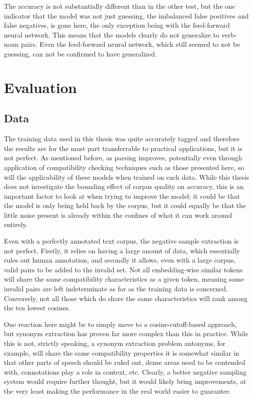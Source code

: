 \documentclass[a4paper, 12pt]{article}
\begin{document}
The accuracy is not substantially different than in the other test, but the one indicator that the model was not just guessing, the imbalanced false positives and false negatives, is gone here, the only exception being with the feed-forward neural network. This means that the models clearly do not generalize to verb-noun pairs. Even the feed-forward neural network, which still seemed to not be guessing, can not be confirmed to have generalized.


\section{Evaluation}

\subsection{Data}
The training data used in this thesis was quite accurately tagged and therefore the results are for the most part transferrable to practical applications, but it is not perfect. As mentioned before, as parsing improves, potentially even through application of compatibility checking techniques such as those presented here, so will the applicability of these models when trained on such data. While this thesis does not investigate the bounding effect of corpus quality on accuracy, this is an important factor to look at when trying to improve the model; it could be that the model is only being held back by the corpus, but it could equally be that the little noise present is already within the confines of what it can work around entirely.

Even with a perfectly annotated text corpus, the negative sample extraction is not perfect. Firstly, it relies on having a large anount of data, which essentially rules out human annotation, and secondly it allows, even with a large corpus, valid pairs to be added to the invalid set. Not all embedding-wise similar tokens will share the same compatibility characteristics as a given token, meaning some invalid pairs are left indeterminate as far as the training data is concerned. Conversely, not all those which do share the same characteristics will rank among the ten lowest cosines.

One reaction here might be to simply move to a cosine-cutoff-based approach, but synonym extraction has proven far more complex than this in practice. While this is not, strictly speaking, a synonym extraction problem \textemdash antonyms, for example, will share the same compatibility properties \textemdash it is somewhat similar in that other parts of speech should be ruled out, dense areas need to be contended with, connotations play a role in context, etc. Clearly, a better negative sampling system would require further thought, but it would likely bring improvements, at the very least making the performance in the real world easier to guarantee.
\end{document}
